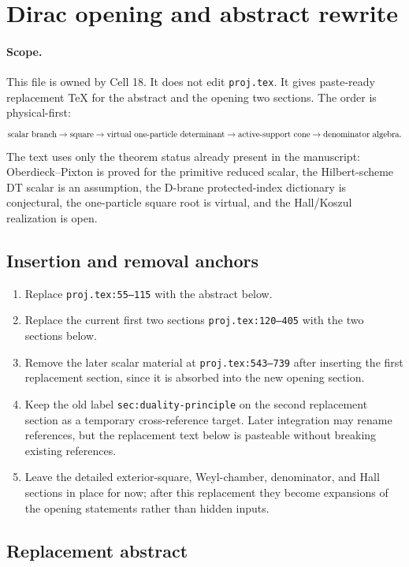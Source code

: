 \section{Dirac opening and abstract rewrite}

\paragraph{Scope.}
This file is owned by Cell 18.  It does not edit \texttt{proj.tex}.  It
gives paste-ready replacement TeX for the abstract and the opening two
sections.  The order is physical-first:
\[
\hbox{scalar branch}\rightarrow
\hbox{square}\rightarrow
\hbox{virtual one-particle determinant}\rightarrow
\hbox{active-support cone}\rightarrow
\hbox{denominator algebra}.
\]
The text uses only the theorem status already present in the manuscript:
Oberdieck--Pixton is proved for the primitive reduced scalar, the
Hilbert-scheme DT scalar is an assumption, the D-brane protected-index
dictionary is conjectural, the one-particle square root is virtual, and
the Hall/Koszul realization is open.

\subsection{Insertion and removal anchors}

\begin{enumerate}
\item Replace \texttt{proj.tex:55--115} with the abstract below.
\item Replace the current first two sections
\texttt{proj.tex:120--405} with the two sections below.
\item Remove the later scalar material at \texttt{proj.tex:543--739}
after inserting the first replacement section, since it is absorbed into
the new opening section.
\item Keep the old label \texttt{sec:duality-principle} on the second
replacement section as a temporary cross-reference target.  Later
integration may rename references, but the replacement text below is
pasteable without breaking existing references.
\item Leave the detailed exterior-square, Weyl-chamber, denominator, and
Hall sections in place for now; after this replacement they become
expansions of the opening statements rather than hidden inputs.
\end{enumerate}

\subsection{Replacement abstract}

